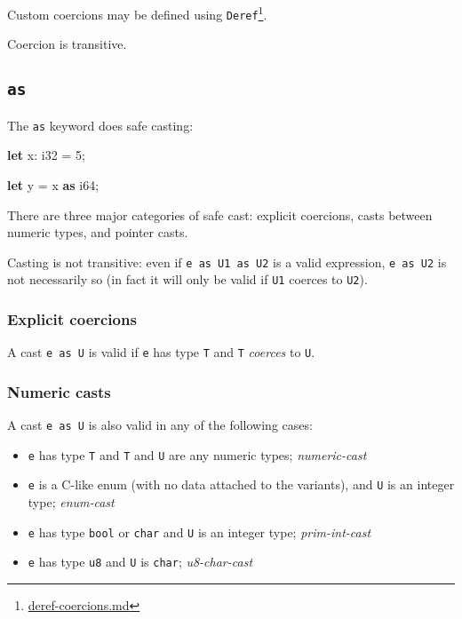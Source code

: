 \documentclass[a4paper,]{book}
\renewcommand*{\hypertarget}[3][\ar]{%
  \def\ar{#2}%
  \label{#1}%
  #3}
\newenvironment{Shaded}{\begin{snugshade}}{\end{snugshade}}
\newcommand{\KeywordTok}[1]{\textcolor[rgb]{0.13,0.29,0.53}{\textbf{{#1}}}}
\newcommand{\DataTypeTok}[1]{\textcolor[rgb]{0.13,0.29,0.53}{{#1}}}
\newcommand{\DecValTok}[1]{\textcolor[rgb]{0.00,0.00,0.81}{{#1}}}
\newcommand{\NormalTok}[1]{{#1}}
\renewcommand{\href}[2]{#2\footnote{\url{#1}}}
\providecommand{\tightlist}{%
  \setlength{\itemsep}{0pt}\setlength{\parskip}{0pt}}
\begin{document}
Custom coercions may be defined using
\href{deref-coercions.md}{\texttt{Deref}}.

Coercion is transitive.

\subsection{\texorpdfstring{\texttt{as}}{as}}\label{as}

The \texttt{as} keyword does safe casting:

\begin{Shaded}
\begin{Highlighting}[]
\KeywordTok{let} \NormalTok{x: }\DataTypeTok{i32} \NormalTok{= }\DecValTok{5}\NormalTok{;}

\KeywordTok{let} \NormalTok{y = x }\KeywordTok{as} \DataTypeTok{i64}\NormalTok{;}
\end{Highlighting}
\end{Shaded}

There are three major categories of safe cast: explicit coercions, casts
between numeric types, and pointer casts.

Casting is not transitive: even if \texttt{e\ as\ U1\ as\ U2} is a valid
expression, \texttt{e\ as\ U2} is not necessarily so (in fact it will
only be valid if \texttt{U1} coerces to \texttt{U2}).

\hypertarget{explicit-coercions}{\subsubsection{Explicit
coercions}\label{explicit-coercions}}

A cast \texttt{e\ as\ U} is valid if \texttt{e} has type \texttt{T} and
\texttt{T} \emph{coerces} to \texttt{U}.

\subsubsection{Numeric casts}\label{numeric-casts}

A cast \texttt{e\ as\ U} is also valid in any of the following cases:

\begin{itemize}
\tightlist
\item
  \texttt{e} has type \texttt{T} and \texttt{T} and \texttt{U} are any
  numeric types; \emph{numeric-cast}
\item
  \texttt{e} is a C-like enum (with no data attached to the variants),
  and \texttt{U} is an integer type; \emph{enum-cast}
\item
  \texttt{e} has type \texttt{bool} or \texttt{char} and \texttt{U} is
  an integer type; \emph{prim-int-cast}
\item
  \texttt{e} has type \texttt{u8} and \texttt{U} is \texttt{char};
  \emph{u8-char-cast}
\end{itemize}
\end{document}
